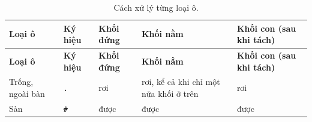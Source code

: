 \begin{longtable}[]{@{}
  >{\raggedright\arraybackslash}p{}
  >{\raggedright\arraybackslash}p{}
  >{\raggedright\arraybackslash}p{}
  >{\raggedright\arraybackslash}p{}
  >{\raggedright\arraybackslash}p{}@{}}
\caption{ Cách xử lý từng loại ô.}\tabularnewline
\toprule\noalign{}
\rowcolor{tablehead}\begin{minipage}[b]{\linewidth}\raggedright
\textbf{Loại ô}
\end{minipage} & \begin{minipage}[b]{\linewidth}\raggedright
\textbf{Ký hiệu}
\end{minipage} & \begin{minipage}[b]{\linewidth}\raggedright
\textbf{Khối đứng}
\end{minipage} & \begin{minipage}[b]{\linewidth}\raggedright
\textbf{Khối nằm}
\end{minipage} & \begin{minipage}[b]{\linewidth}\raggedright
\textbf{Khối con (sau khi tách)}
\end{minipage} \\
\midrule\noalign{}
\endfirsthead
\toprule\noalign{}
\rowcolor{tablehead}\begin{minipage}[b]{\linewidth}\raggedright
\textbf{Loại ô}
\end{minipage} & \begin{minipage}[b]{\linewidth}\raggedright
\textbf{Ký hiệu}
\end{minipage} & \begin{minipage}[b]{\linewidth}\raggedright
\textbf{Khối đứng}
\end{minipage} & \begin{minipage}[b]{\linewidth}\raggedright
\textbf{Khối nằm}
\end{minipage} & \begin{minipage}[b]{\linewidth}\raggedright
\textbf{Khối con (sau khi tách)}
\end{minipage} \\
\midrule\noalign{}
\endhead
\bottomrule\noalign{}
\endlastfoot
Trống, ngoài bàn & \texttt{.\allowbreak{}} & rơi & rơi, kể cả khi chỉ một nửa khối ở trên & rơi \\
\rowrule
Sàn & \texttt{\#} & được & được & được \\

\end{longtable}

